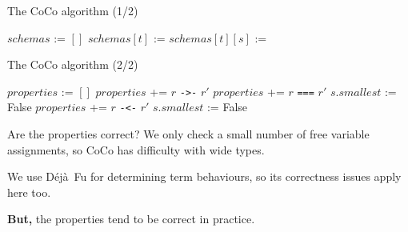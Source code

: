\documentclass{beamer}
\newcommand{\dejafu}{D\'{e}j\`{a}~Fu}
\begin{document}
\begin{frame}{The CoCo algorithm \hfill\footnotesize (1/2)}
\begin{center}
\begin{minipage}{\linewidth}
\begin{algorithmic}
  \State $schemas$ := $[]$
    \State $schemas[t]$ := 
      \State $schemas[t][s]$ := 
          \State {}
        \EndFor
      \EndFor
    \EndFor
  \EndFor
\EndFunction
\end{algorithmic}
\end{minipage}
\end{center}
\end{frame}

\begin{frame}{The CoCo algorithm \hfill\footnotesize (2/2)}
\begin{center}
\begin{minipage}{\linewidth}
\begin{algorithmic}
  \State $properties$ := $[]$
          \State $properties$ += $r$ \texttt{->-} $r'$
          \State $properties$ += $r$ \texttt{===} $r'$
          \State $s.smallest$ := False
          \State $properties$ += $r$ \texttt{-<-} $r'$
          \State $s.smallest$ := False
        \EndIf
      \EndFor
    \EndFor
  \EndFor
  \State {}
\EndFunction
\end{algorithmic}
\end{minipage}
\end{center}
\end{frame}

\begin{frame}{Are the properties correct?}
  We only check a small number of free variable assignments, so CoCo
  has difficulty with wide types.

  We use \dejafu{} for determining term behaviours, so its correctness
  issues apply here too.

  \textbf{But,} the properties tend to be correct in practice.
\end{frame}
\end{document}
